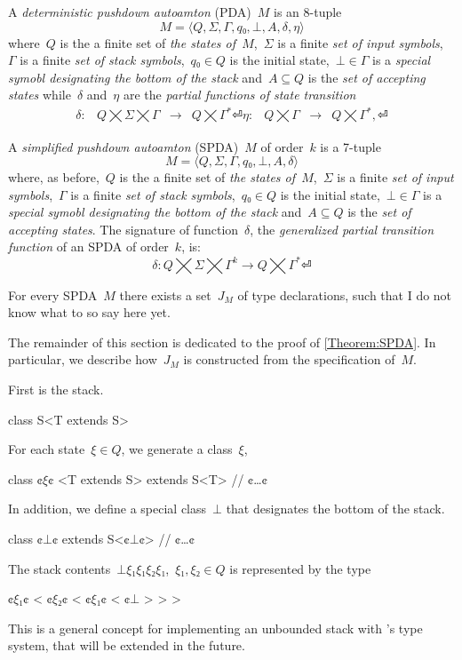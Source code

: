 \begin{Definition}
  A \emph{deterministic pushdown autoamton} (PDA)~$M$ is an 8-tuple
  \[
    M =⟨Q,Σ,Γ, q₀,⊥, A,δ,η⟩
  \]
  where~$Q$ is the a finite set of
  \emph{the states of~$M$},~$Σ$ is a finite
  \emph{set of input symbols},~$Γ$ is a finite
  \emph{set of stack symbols},~$q₀∈Q$ is the initial state,~$⊥∈Γ$
  is a \emph{special symobl designating the bottom of the stack}
  and~$A⊆Q$ is the \emph{set of accepting states} while~$δ$ and~$η$ are
  the \emph{partial functions of state transition}
  \[
    \begin{array}{crlc}
      δ: & Q⨉Σ⨉Γ & → & Q⨉Γ^*⏎
      η: & Q⨉Γ & → & Q⨉Γ^*,⏎
    \end{array}
  \]
\end{Definition}

\begin{Definition}
  A \emph{simplified pushdown autoamton} (SPDA)~$M$ of order~$k$ is a 7-tuple
  \[
    M =⟨Q,Σ,Γ,q₀,⊥, A,δ⟩
  \]
  where, as before,~$Q$ is the a finite set of
  \emph{the states of~$M$},~$Σ$ is a finite
  \emph{set of input symbols},~$Γ$ is a finite
  \emph{set of stack symbols},~$q₀∈Q$ is the initial state,~$⊥∈Γ$
  is a \emph{special symobl designating the bottom of the stack}
  and~$A⊆Q$ is the \emph{set of accepting states}.
  The signature of function~$δ$, the \emph{generalized partial transition function}
  of an SPDA of order~$k$, is:
  \[
      δ: Q⨉Σ⨉Γ^k → Q⨉Γ^*⏎
  \]
\end{Definition}

\begin{Theorem}
  \label{Theorem:SPDA}
  For every SPDA~$M$ there exists a set~$J_M$ of \Java type declarations, such that
    I do not know what to so say here yet.
\end{Theorem}

The remainder of this section is dedicated to the proof of \cref{Theorem:SPDA}.
In particular, we describe how~$J_M$ is constructed from the
  specification of~$M$.

First is the stack.
\begin{JAVA}
class S<T extends S> {
}
\end{JAVA}
For each state~$ξ∈Q$, we generate a \Java class~$ξ$,
\begin{JAVA}
class ¢$ξ$¢ <T extends S> extends S<T>{
  // ¢…¢
}
\end{JAVA}
In addition, we define a special class~$⊥$ that designates the bottom of the stack.
\begin{JAVA}
class ¢$⊥$¢ extends S<¢$⊥$¢> {
  // ¢…¢
}
\end{JAVA}
The stack contents~$⊥ξ₁ξ₁ξ₂ξ₁$,~$ξ₁,ξ₂∈Q$
is represented by the type
\begin{JAVA}
  ¢$ξ₁$¢ < ¢$ξ₂$¢ < ¢$ξ₁$¢ < ¢$⊥$ > > >
\end{JAVA}
This is a general concept for implementing an unbounded stack with \Java's type system, 
that will be extended in the future.


